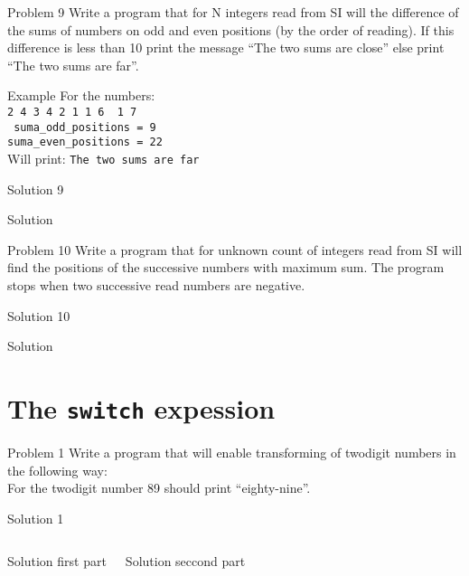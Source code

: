 \begin{frame}{Problem 9}
Write a program that for N integers read from SI will the difference of the sums
of numbers on odd and even positions (by the order of reading). If this
difference is less than 10 print the message ``The two sums are close'' else
print ``The two sums are far''.
\begin{exampleblock}{Example}
For the numbers:\\
\texttt{{\color{red}2} 4 {\color{red}3} 4 {\color{red}2} 1 {\color{red}1} 6
{\color{red} 1} 7}\\
\texttt{{\color{red} suma\_odd\_positions = 9}}\\
\texttt{suma\_even\_positions = 22}\\
Will print: \texttt{The two sums are far}
\end{exampleblock}
\end{frame}

\begin{frame}[fragile]{Solution 9}
\begin{exampleblock}{Solution}

\end{exampleblock}
\end{frame}

\begin{frame}{Problem 10}
Write a program that for unknown count of integers read from SI will find the
positions of the successive numbers with maximum sum. The program stops when two
successive read numbers are negative.
\end{frame}

\begin{frame}[fragile]{Solution 10}
\begin{exampleblock}{Solution}

\end{exampleblock}
\end{frame}

\section{The \texttt{switch} expession}
\begin{frame}{Problem 1}
Write a program that will enable transforming of twodigit numbers in the
following way:\\
For the twodigit number 89 should print ``eighty-nine''.
\end{frame}

\begin{frame}[t,fragile,shrink=35]{Solution 1}
\begin{columns}
\begin{exampleblock}{Solution first part}

\end{exampleblock}
\begin{exampleblock}{Solution seccond part}

\end{exampleblock}
\end{columns}
\end{frame}


